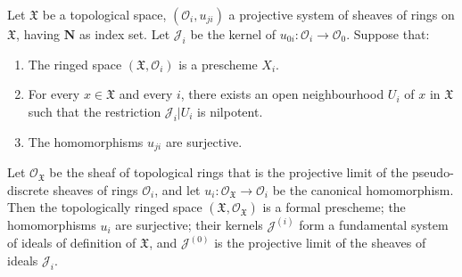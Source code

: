 \begin{proposition}[10.6.3]
\label{I.10.6.3}
Let $\mathfrak{X}$ be a topological space,
$(\mathscr{O}_i,u_{ji})$ a projective system of sheaves of rings on
$\mathfrak{X}$, having $\mathbf{N}$ as index set. Let
$\mathscr{J}_i$ be the kernel of
$u_{0i}:\mathscr{O}_i\to\mathscr{O}_0$. Suppose that:
\begin{enumerate}
  \item[\textup{a)}] The ringed space $(\mathfrak{X},\mathscr{O}_i)$ is a
    prescheme $X_i$.
  \item[\textup{b)}] For every $x\in\mathfrak{X}$ and every $i$, there exists an open
    neighbourhood $U_i$ of $x$ in $\mathfrak{X}$ such that the
    restriction $\mathscr{J}_i|U_i$ is nilpotent.
  \item[\textup{c)}] The homomorphisms $u_{ji}$ are surjective.
\end{enumerate}


Let $\mathscr{O}_{\mathfrak{X}}$ be the sheaf of topological rings
that is the projective limit of the pseudo-discrete sheaves of rings
$\mathscr{O}_i$, and let
$u_i:\mathscr{O}_{\mathfrak{X}}\to\mathscr{O}_i$ be the canonical
homomorphism. Then the topologically ringed space
$(\mathfrak{X},\mathscr{O}_{\mathfrak{X}})$ is a formal prescheme;
the homomorphisms $u_i$ are surjective; their kernels
$\mathscr{J}^{(i)}$ form a fundamental system of ideals of definition
of $\mathfrak{X}$, and $\mathscr{J}^{(0)}$ is the projective limit of the
sheaves of ideals $\mathscr{J}_i$.
\end{proposition}

